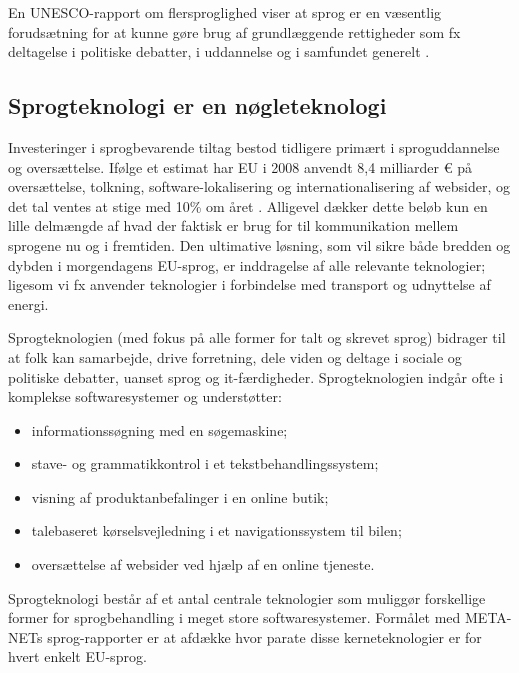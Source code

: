\begin{multicols}{2}
En UNESCO-rapport om flersproglighed viser at sprog er en v\ae sentlig foruds\ae tning for at kunne g\o re brug af grundl\ae ggende rettigheder som fx deltagelse i politiske debatter, i uddannelse og i samfundet generelt \cite{Unesco1}.

\subsection{Sprogteknologi er en n\o gleteknologi}

 Investeringer i sprogbevarende tiltag bestod tidligere prim\ae rt i sproguddannelse og overs\ae ttelse. If\o lge et estimat har EU i 2008 anvendt 8,4 milliarder € \mbox{p\aa} overs\ae ttelse, tolkning, software-lokalisering og internatio\-nalisering af websider, og det tal ventes at stige med 10\% om \aa ret \cite{EC3}. Alligevel d\ae kker dette bel\o b kun en lille delm\ae ngde af hvad der faktisk er brug for til kommunikation mellem sprogene nu og i fremtiden. Den ultimative l\o sning, som vil sikre b\aa de bredden og dybden i morgendagens EU-sprog, er inddragelse af alle relevante teknologier; ligesom vi fx anvender teknologier i forbindelse med transport og udnyttelse af energi.

   Sprogteknologien (med fokus \mbox{p\aa} alle former for talt og skrevet sprog) bidrager til at folk kan samarbejde, drive forretning, dele viden og deltage i sociale og politiske debatter, uanset sprog og it-f\ae rdigheder. Sprogteknologien indg\aa r ofte i komplekse softwaresystemer og underst\o tter:

\begin{itemize}
     \item informationss\o gning med en s\o ge\-maskine;
      \item stave- og grammatikkontrol i et tekstbehandlingssystem;
      \item visning af produktanbefalinger i en online butik;
      \item talebaseret k\o rselsvejledning i et navigationssystem til bilen;
      \item overs\ae ttelse af websider ved hj\ae lp af en online tje\-neste.
\end{itemize}

Sprogteknologi best\aa r af et antal centrale teknologier som muligg\o r forskellige former for sprogbehandling i meget store softwaresystemer. Form\aa let med META-NETs sprog-rapporter er at afd\ae kke hvor parate disse kerneteknologier er for hvert enkelt EU-sprog. 


\end{multicols}
